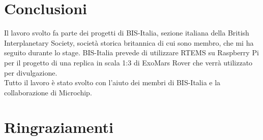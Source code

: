 \documentclass[12pt, a4paper, titlepage, oneside]{book}
\begin{document}
\begin{flushleft}
\chapter{Conclusioni}

Il lavoro svolto fa parte dei progetti di BIS-Italia, sezione italiana della British Interplanetary Society, società storica britannica di cui sono membro, che mi ha seguito durante lo stage. BIS-Italia prevede di utilizzare RTEMS su Raspberry Pi per il progetto di una replica in scala 1:3 di ExoMars Rover che verrà utilizzato per divulgazione.\\
Tutto il lavoro è stato svolto con l'aiuto dei membri di BIS-Italia e la collaborazione di Microchip.

\chapter*{Ringraziamenti}
\printbibliography


\end{flushleft}
\end{document}
